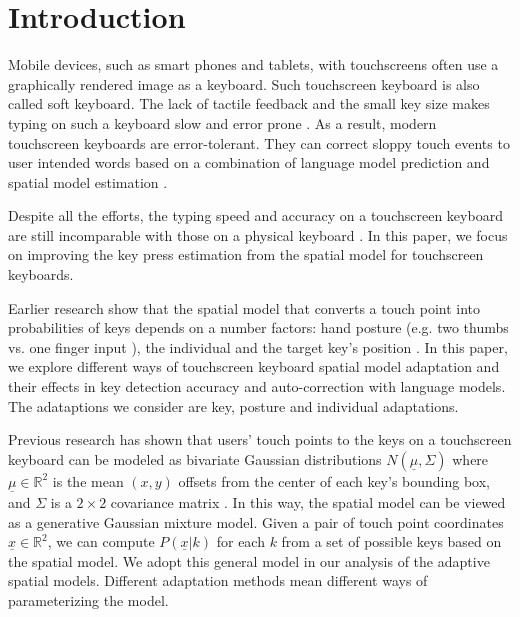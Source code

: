 \documentclass{sigchi}
\begin{document}
\section{Introduction}
Mobile devices, such as smart phones and tablets, with touchscreens often use
a graphically rendered image as a keyboard. Such touchscreen keyboard is also called
soft keyboard. The lack of tactile feedback and the small key size makes typing on
such a keyboard slow and error prone \cite{Brewster:2007, Rabin:2004}.
As a result, modern touchscreen keyboards are error-tolerant. They can correct sloppy touch
events to user intended words based on a combination of language model prediction 
and spatial model estimation \cite{AlFaraj:2009, Aulagner:2010, Goodman:2002, Gunawardana:2010}. 

Despite all the efforts, the typing speed and accuracy on a touchscreen keyboard are
still incomparable with those on a physical keyboard \cite{Hoggan:2008}. In this paper,
we focus on improving the key press estimation from the spatial model for touchscreen
keyboards. 

Earlier research show that the spatial model that converts a touch point into probabilities of keys 
depends on a number factors: hand posture (e.g. two thumbs vs. one finger input \cite{Azenkot:2012}), 
the individual \cite{Findlater:2012} and the target key's position \cite{Azenkot:2012}.
In this paper, we explore different ways of touchscreen keyboard spatial model adaptation and
their effects in key detection accuracy and auto-correction with language
models. The adataptions we consider are key, posture and individual adaptations. 

Previous research has shown that users' touch points to the keys on a touchscreen
keyboard can be modeled as bivariate Gaussian distributions $N(\underline\mu, \Sigma)$
where $\underline\mu \in \mathbb{R}^2$ is the mean $(x, y)$ offsets from the center of
each key's bounding box, and $\Sigma$ is a $2\times 2$ covariance matrix  
\cite{Azenkot:2012, Goodman:2002}.
In this way, the spatial model can be viewed as a generative Gaussian mixture
model.  Given a pair of touch point coordinates $\underline x \in \mathbb{R}^2$, we can compute
$P(\underline x | k)$ for each $k$ from a set of possible keys based on the spatial model.
We adopt this general model in our analysis of the adaptive spatial models.
Different adaptation methods mean different ways of parameterizing the model.
\end{document}
